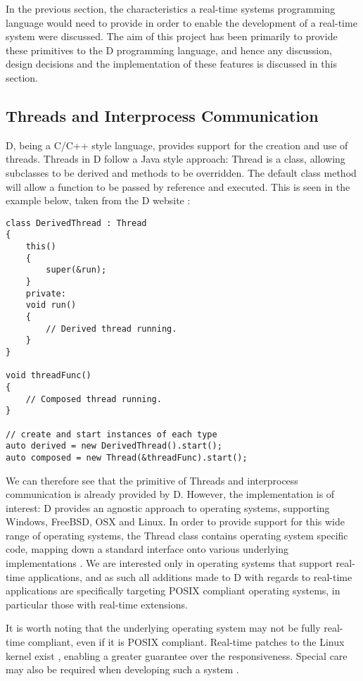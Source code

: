 
In the previous section, the characteristics a real-time 
systems programming language would need to provide in order to enable the 
development of a real-time system were discussed. The aim of this project has been primarily to 
provide these primitives to the D programming language, and hence any discussion, 
design decisions and the implementation of these features is discussed in this 
section. 

\subsection{Threads and Interprocess Communication}
D, being a C/C++ style language, provides support for the creation and use of 
threads. Threads in D follow a Java style approach: Thread is a class, 
allowing subclasses to be derived and methods to be overridden. The default 
class method will allow a function to be passed by reference and executed. 
This is seen in the example below, taken from the D website
\cite{core-thread}: 
\begin{lstlisting}
class DerivedThread : Thread
{
    this()
    {
        super(&run);
    }
    private:
    void run()
    {
        // Derived thread running.
    }
}

void threadFunc()
{
    // Composed thread running.
}

// create and start instances of each type
auto derived = new DerivedThread().start();
auto composed = new Thread(&threadFunc).start();
\end{lstlisting}
We can therefore see that the primitive of Threads and interprocess communication 
is already provided by D. However, the implementation is of interest: D 
provides an agnostic approach to operating systems, supporting Windows, FreeBSD, 
OSX and Linux. 
In order to provide support for this wide range of operating systems, the Thread 
class contains operating system specific code, mapping down a standard interface 
onto various underlying implementations 
\cite{github-core-thread}. 
We are interested only in operating systems 
that support real-time applications, and as such all additions made to D with 
regards to real-time applications are specifically targeting POSIX compliant 
operating systems, in particular those with real-time extensions. 
\par\bigskip\noindent
It is worth noting that the underlying operating system may not be fully
real-time compliant, even if it is POSIX compliant. Real-time patches to the 
Linux kernel exist 
\cite{rt-wiki}, enabling a greater 
guarantee over the responsiveness. Special care may also be required when 
developing such a system 
\cite {rt-wiki-how-to}. 

